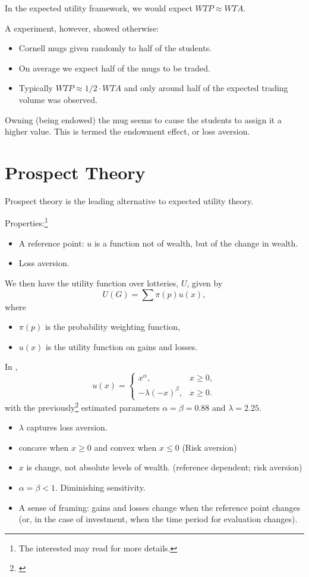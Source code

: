 \documentclass[oneside,reqno,letterpaper]{amsart}
\begin{document}
In the expected utility framework, we would expect \(WTP \approx WTA\).

A \Textcite{Kahneman1991Endowment} experiment, however, showed otherwise:
\begin{itemize}
  \item Cornell mugs given randomly to half of the students. 
  \item On average we expect half of the mugs to be traded.
  \item Typically \(WTP \approx 1 / 2 \cdot WTA\) and only around half of the expected trading volume was observed. 
\end{itemize}
Owning (being endowed) the mug seems to cause the students to assign it a higher value.
This is termed the endowment effect, or loss aversion.



\section{Prospect Theory}
Prospect theory is the leading alternative to expected utility theory.

Properties:\footnote{The interested may read \textcite{kahneman2013prospect} for more details.}
\begin{itemize}
  \item A reference point: \(u\) is a function not of wealth, but of the change in wealth.
  \item Loss aversion. 
\end{itemize}
We then have the utility function over lotteries, \(U\), given by
\[
  U(G) = \sum \pi(p) u(x),
\] 
where
\begin{itemize}
  \item \(\pi(p)\) is the probability weighting function,
  \item \(u(x)\) is the utility function on gains and losses.
\end{itemize}

In \textcite{Benartzi1995Myopic}, 
\[
  u(x) = \begin{cases}
    x^{\alpha}, & x \geq 0, \\ 
    -\lambda (-x)^{\beta}, & x \geq 0. 
  \end{cases}
\] 
with the previously\footnote{\textcite{Tversky1992Advances}} estimated parameters \(\alpha = \beta = 0.88\) and \(\lambda = 2.25\). 


\begin{itemize}
  \item \(\lambda\) captures loss aversion.
  \item concave when \(x \geq 0\) and convex when \(x \leq 0\) (Risk aversion)
  \item \(x\) is change, not absolute levels of wealth. (reference dependent; risk aversion)
  \item \(\alpha = \beta < 1\). Diminishing sensitivity. 
  \item A sense of framing: gains and losses change when the reference point changes (or, in the case of investment, when the time period for evaluation changes).
\end{itemize}
\end{document}
